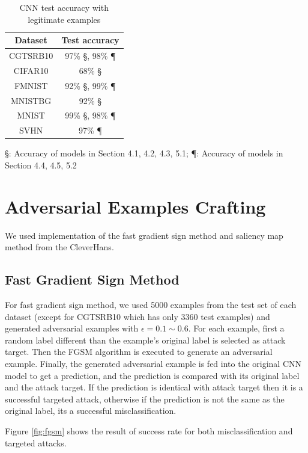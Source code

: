 \documentclass{article}
\begin{document}
\begin{table}
\centering
\begin{tabular}{cc}
    \toprule
    Dataset & Test accuracy \\
    \midrule
    CGTSRB10 & 97\% \S, 98\% \P \\
    CIFAR10 & 68\% \S \\
    FMNIST & 92\% \S, 99\% \P \\
    MNISTBG & 92\% \S \\
    MNIST & 99\% \S, 98\% \P \\
    SVHN & 97\% \P \\
    \bottomrule
\end{tabular}
\begin{tablenotes}
    \item \S: Accuracy of models in Section 4.1, 4.2, 4.3, 5.1; \P: Accuracy of models in Section 4.4, 4.5, 5.2
\end{tablenotes}
\caption{\label{tab:cnnaccuracy} CNN test accuracy with legitimate examples}
\end{table}


\section{Adversarial Examples Crafting}

We used implementation of the fast gradient sign method and saliency map method from the CleverHans\cite{cleverhans}.

\subsection{Fast Gradient Sign Method}

For fast gradient sign method, we used 5000 examples from the test set of each dataset (except for CGTSRB10 which has only 3360 test examples)
and generated adversarial examples with \(\epsilon=0.1 \sim 0.6\).
For each example, first a random label different than the example's original label is selected as attack target.
Then the FGSM algorithm is executed to generate an adversarial example.
Finally, the generated adversarial example is fed into the original CNN model to get a prediction,
and the prediction is compared with its original label and the attack target.
If the prediction is identical with attack target then it is a successful targeted attack,
otherwise if the prediction is not the same as the original label, its a successful misclassification.

Figure \ref{fig:fgsm} shows the result of success rate for both misclassification and targeted attacks.
\end{document}
